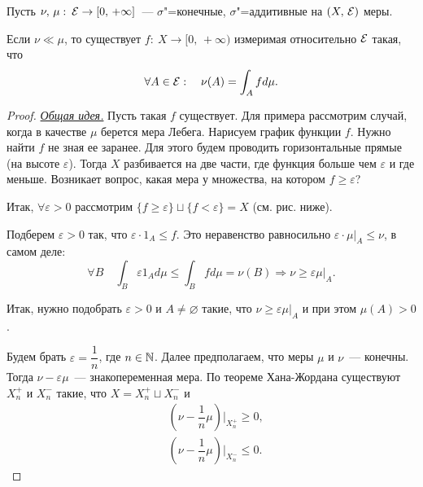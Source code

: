 \begin{theorem}
    Пусть $\nu,\, \mu:\:\mathcal{E}\to[0,\, +\infty]$~--- $\sigma$"=конечные,
    $\sigma$"=аддитивные на $(X,\, \mathcal{E})$ меры.

    Если $\nu\ll\mu$, то существует $f:\: X\to[0,\, +\infty)$
    измеримая относительно $\mathcal{E}$ такая, что
    \[
        \forall A\in\mathcal{E}:\quad \nu(A)=\int_A fd\mu.
    \]

    \begin{proof}

        \underline{\textit{Общая идея.}}
        Пусть такая $f$ существует. Для примера рассмотрим случай, когда в качестве
        $\mu$ берется мера Лебега.
        Нарисуем график функции $f$. Нужно найти $f$ не зная ее заранее.
        Для этого будем проводить горизонтальные прямые (на высоте $\varepsilon$).
        Тогда $X$ разбивается на две части, где функция больше чем $\varepsilon$ и
        где меньше. Возникает вопрос, какая мера у множества, на котором $f\geqslant\varepsilon$?

        Итак, $\forall\varepsilon>0$ рассмотрим $\{f\geqslant \varepsilon\}\sqcup
            \{f<\varepsilon\}=X$ (см. рис. ниже).

        \begin{center}
            
        \end{center}

        Подберем $\varepsilon>0$ так, что
        $\varepsilon\cdot 1_A\leqslant f$. Это неравенство равносильно
        $\varepsilon\cdot\mu|_A\leqslant\nu$, в самом деле: \[
            \forall B\quad \int_B\varepsilon1_Ad\mu\leqslant\int_Bfd\mu=\nu(B)\Rightarrow
            \nu\geqslant \varepsilon\mu|_A.
        \]

        Итак, нужно подобрать $\varepsilon>0$ и $A\neq\varnothing$ такие, что
        $\nu\geqslant\varepsilon\mu|_A$ и при этом $\mu(A)>0$.

        Будем брать $\varepsilon=\dfrac{1}{n}$, где $n\in\mathbb{N}$.
        Далее предполагаем, что меры $\mu$ и $\nu$~--- конечны.
        Тогда $\nu-\varepsilon\mu$~--- знакопеременная мера.
        По теореме Хана-Жордана существуют $X^+_n$ и $X^-_n$ такие, что
        $X = X^+_n\sqcup X^-_n$ и \begin{align*}
             & \left(\nu-\dfrac{1}{n}\mu\right)\bigg|_{X^+_n}\geqslant 0, \\
             & \left(\nu-\dfrac{1}{n}\mu\right)\bigg|_{X^-_n}\leqslant 0.
        \end{align*}


\end{proof}
\end{theorem}
